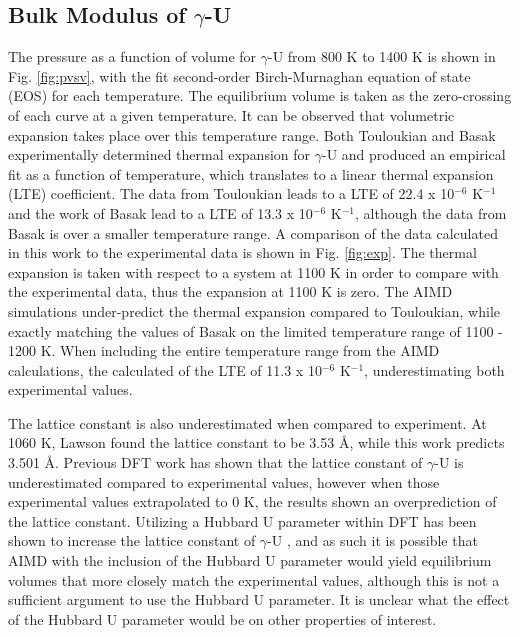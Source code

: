 \documentclass[review]{elsarticle}
\begin{document}
\subsection{Bulk Modulus of $\gamma$-U}

The pressure as a function of volume for $\gamma$-U from 800 K to 1400 K is shown in Fig. \ref{fig:pvsv}, with the fit second-order Birch-Murnaghan equation of state (EOS) for each temperature. The equilibrium volume is taken as the zero-crossing of each curve at a given temperature. It can be observed that volumetric expansion takes place over this temperature range. Both Touloukian \cite{touloukian} and Basak \cite{basak} experimentally determined thermal expansion for $\gamma$-U and produced an empirical fit as a function of temperature, which translates to a linear thermal expansion (LTE) coefficient. The data from Touloukian leads to a LTE of 22.4 x 10$^{-6}$ K$^{-1}$ and the work of Basak lead to a LTE of 13.3 x 10$^{-6}$ K$^{-1}$, although the data from Basak is over a smaller temperature range. A comparison of the data calculated in this work to the experimental data is shown in Fig. \ref{fig:exp}. The thermal expansion is taken with respect to a system at 1100 K in order to compare with the experimental data, thus the expansion at 1100 K is zero. The AIMD simulations under-predict the thermal expansion compared to Touloukian, while exactly matching the values of Basak on the limited temperature range of 1100 - 1200 K. When including the entire temperature range from the AIMD calculations, the calculated of the LTE of 11.3 x 10$^{-6}$ K$^{-1}$, underestimating both experimental values.

The lattice constant is also underestimated when compared to experiment. At 1060 K, Lawson \cite{lawson1988} found the lattice constant to be 3.53 {\AA}, while this work predicts 3.501 {\AA}. Previous DFT work has shown that the lattice constant of $\gamma$-U is underestimated compared to experimental values, however when those experimental values extrapolated to 0 K, the results shown an overprediction of the lattice constant\cite{beeler2010, xie2013}. Utilizing a Hubbard U parameter within DFT has been shown to increase the lattice constant of $\gamma$-U \cite{xie2013}, and as such it is possible that AIMD with the inclusion of the Hubbard U parameter would yield equilibrium volumes that more closely match the experimental values, although this is not a sufficient argument to use the Hubbard U parameter. It is unclear what the effect of the Hubbard U parameter would be on other properties of interest. 
\end{document}
